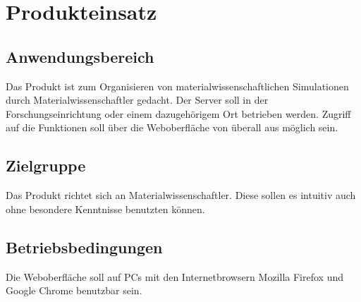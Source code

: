 \chapter{Produkteinsatz}
\section{Anwendungsbereich}
Das Produkt ist zum Organisieren von materialwissenschaftlichen Simulationen durch Materialwissenschaftler gedacht. 
Der Server soll in der Forschungseinrichtung oder einem dazugehörigem Ort betrieben werden.
Zugriff auf die Funktionen soll über die Weboberfläche von überall aus möglich sein.

\section{Zielgruppe}
Das Produkt richtet sich an Materialwissenschaftler.
Diese sollen es intuitiv auch ohne besondere Kenntnisse benutzten können.

\section{Betriebsbedingungen}
Die Weboberfläche soll auf PCs mit den Internetbrowsern Mozilla Firefox und Google Chrome benutzbar sein.
